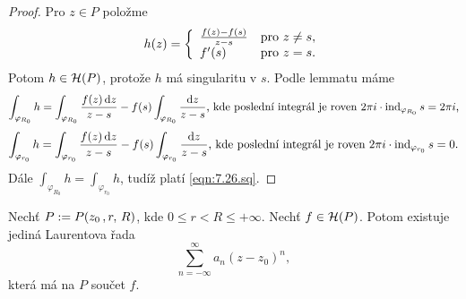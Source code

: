 \begin{proof}
Pro $z \in P$ položme 
\begin{equation*}
    h(z)=\left\{ \begin{array}{ll} \frac{f(z)-f(s)}{z-s} & \mbox{pro } z \neq s, \\ f'(s) & \mbox{pro } z=s. \end{array} \right.
\end{equation*}
Potom $h \in \operatorname{\mathcal{H}} (P)$, protože $h$ má  singularitu v $s$. Podle lemmatu máme
$$
\int_{\varphi_{R_0}}h=\int_{\varphi_{R_0}}\frac{f(z) \mathop{}\!\mathrm{d} z}{z-s}-f(s) \int_{\varphi_{R_0}}\frac{\mathop{}\!\mathrm{d} z}{z-s}\text{, kde poslední integrál je roven }2\pi i \cdot \operatorname{ind}_{\varphi_{R_0}}s=2 \pi i\text{,}
$$
$$
\int_{\varphi_{r_0}}h=\int_{\varphi_{r_0}}\frac{f(z) \mathop{}\!\mathrm{d} z}{z-s}-f(s) \int_{\varphi_{r_0}}\frac{\mathop{}\!\mathrm{d} z}{z-s}\text{, kde poslední integrál je roven }2\pi i \cdot \operatorname{ind}_{\varphi_{r_0}}s=0{.}
$$
Dále $\int_{\varphi_{R_0}}h=\int_{\varphi_{r_0}}h$, tudíž platí \cref{eqn:7.26.sq}.
\end{proof}

\begin{theorem}
Nechť $P:= \\ P(z_0\,,r,\,R)$, kde $0\leq r < R \leq + \infty$. Nechť $f \in \operatorname{\mathcal{H}} (P)$. Potom existuje jediná Laurentova řada 
\begin{equation}
    \sum\limits_{n=-\infty}^{\infty} a_n(z-z_0)^n,  
    \tag{L}
    \label{eqn:7.27.lau}
\end{equation}
která má na $P$ součet $f$.
\end{theorem}

